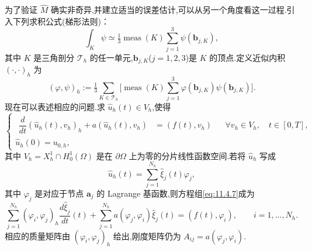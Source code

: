 为了验证 \(\widehat M\) 确实非奇异,并建立适当的误差估计,可以从另一个角度看这一过程.引入下列求积公式(梯形法则)：
\begin{equation}\label{eq:11.4.5}
  \int_K\psi\simeq\tfrac13\operatorname{meas}(K)
    \sum_{j=1}^3\psi(\boldsymbol{b}_{j,K}),
\end{equation}
其中 \(K\) 是三角剖分 \(\mathcal T_h\) 的任一单元,\(\boldsymbol{b}_{j,K}\)(\(j=1,2,3\))是 \(K\) 的顶点.定义近似内积 \((\cdot,\cdot)_h\) 为
\begin{equation}\label{eq:11.4.6}
  (\varphi,\psi)_h
  :=\tfrac13\sum_{K\in\mathcal T_h}
    \biggl[\operatorname{meas}(K)\sum_{j=1}^3
      \varphi(\boldsymbol{b}_{j,K})\psi(\boldsymbol{b}_{j,K})\biggr].
\end{equation}
现在可以表述相应的问题.求 \(\widehat u_h(t)\in V_h\),使得
\begin{equation}\label{eq:11.4.7}
  \begin{cases}
    \begin{aligned}
      \dfrac{d}{dt}(\widehat u_h(t),v_h)_h+a(\widehat u_h(t),v_h)
        &=(f(t),v_h)
        &&\forall v_h\in V_h,\quad t\in[0,T],
    \end{aligned}\\[2pt]
    \widehat u_h(0)=u_{0,h},
  \end{cases}
\end{equation}
其中 \(V_h=X_h^1\cap H_0^1(\Omega)\) 是在 \(\partial\Omega\) 上为零的分片线性函数空间.若将 \(\widehat u_h\) 写成
\[
  \widehat u_h(t)=\sum_{j=1}^{N_h}\widehat\xi_j(t)\varphi_j,
\]
其中 \(\varphi_j\) 是对应于节点 \(\boldsymbol{a}_j\) 的 Lagrange 基函数,则方程组\eqref{eq:11.4.7}成为
\[
  \sum_{j=1}^{N_h}(\varphi_i,\varphi_j)_h\frac{d\widehat\xi_j}{dt}(t)
  +\sum_{j=1}^{N_h}a(\varphi_j,\varphi_i)\widehat\xi_j(t)
  =(f(t),\varphi_i),\qquad i=1,\ldots,N_h.
\]
相应的质量矩阵由 \((\varphi_i,\varphi_j)_h\) 给出,刚度矩阵仍为 \(A_{ij}=a(\varphi_j,\varphi_i)\).

